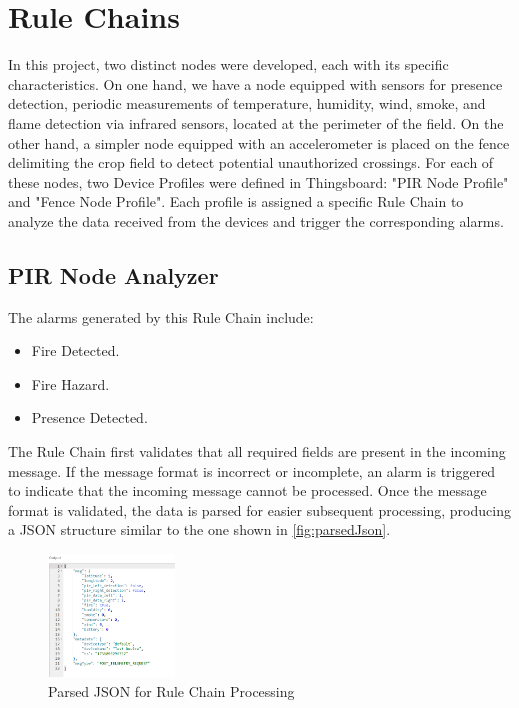 \section{Rule Chains}
In this project, two distinct nodes were developed, each with its specific characteristics. On one hand, we have a node equipped with sensors for presence detection, 
periodic measurements of temperature, humidity, wind, smoke, and flame detection via infrared sensors, located at the perimeter of the field. On the other hand, a 
simpler node equipped with an accelerometer is placed on the fence delimiting the crop field to detect potential unauthorized crossings. For each of these nodes,
two Device Profiles were defined in Thingsboard: "PIR Node Profile" and "Fence Node Profile". Each profile is assigned a specific Rule Chain to analyze the data 
received from the devices and trigger the corresponding alarms.


\subsection{PIR Node Analyzer}
The alarms generated by this Rule Chain include:
\begin{itemize}
    \item Fire Detected.
    \item Fire Hazard.
    \item Presence Detected.
\end{itemize}

The Rule Chain first validates that all required fields are present in the incoming message. If the message format is incorrect or incomplete, an alarm is triggered 
to indicate that the incoming message cannot be processed. Once the message format is validated, the data is parsed for easier subsequent processing, producing a JSON
structure similar to the one shown in \autoref{fig:parsedJson}.

\begin{figure}[H]
    \centering
    \includegraphics[width=0.3\textwidth]{./images/8/jsonParsed.PNG}
    \caption{Parsed JSON for Rule Chain Processing}
    \label{fig:parsedJson}
\end{figure}

